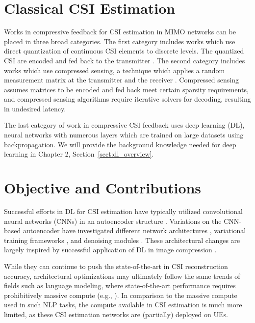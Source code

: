 \section{Classical CSI Estimation}
\label{sect:classic_estimation}

Works in compressive feedback for CSI estimation in MIMO networks can be placed in three broad categories. The first category includes works which use direct quantization of continuous CSI elements to discrete levels. The quantized CSI are encoded and fed back to the transmitter \cite{ref:makki2012hybrid,ref:shirani2009channel}. The second category includes works which use compressed sensing, a technique which applies a random measurement matrix at the transmitter and the receiver \cite{ref:rao2014distributed, ref:eltayeb2014compressive}. Compressed sensing assumes matrices to be encoded and fed back meet certain sparsity requirements, and compressed sensing algorithms require iterative solvers \cite{ref:do2008sparsity} for decoding, resulting in undesired latency.

The last category of work in compressive CSI feedback uses deep learning (DL), neural networks with numerous layers which are trained on large datasets using backpropagation. We will provide the background knowledge needed for deep learning in Chapter 2, Section~\ref{sect:dl_overview}.

\section{Objective and Contributions}

Successful efforts in DL for CSI estimation have typically utilized convolutional neural networks (CNNs) in an autoencoder structure \cite{ref:csinet}. Variations on the CNN-based autoencoder have investigated different network architectures \cite{ref:Lu2020CRNet}, variational training frameworks \cite{ref:Hussien2020PRVNet}, and denoising modules \cite{ref:Sun2020AnciNet}. These architectural changes are largely inspired by successful application of DL in image compression \cite{ref:szegedy2017inception,ref:balle2017end,ref:xie2012image}.

While they can continue to push the state-of-the-art in CSI reconstruction accuracy, architectural optimizations may ultimately follow the same trends of fields such as language modeling, where state-of-the-art performance requires prohibitively massive compute (e.g., \cite{ref:brown2020language}). In comparison to the massive compute used in such NLP tasks, the compute available in CSI estimation is much more limited, as these CSI estimation networks are (partially) deployed on UEs. 

